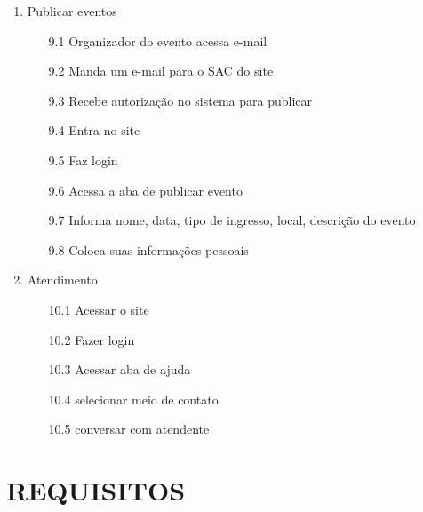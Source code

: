 \documentclass[12pt]{article}
\begin{document}
\begin{enumerate}
            \item Publicar eventos
                \begin{enumerate}
                    \item[9.1] Organizador do evento acessa e-mail
                    \item[9.2] Manda um e-mail para o SAC do site
                    \item[9.3] Recebe autorização no sistema para publicar
                    \item[9.4] Entra no site
                    \item[9.5] Faz login
                    \item[9.6] Acessa a aba de publicar evento
                    \item[9.7] Informa nome, data, tipo de ingresso, local, descrição do evento
                    \item[9.8] Coloca suas informações pessoais
                \end{enumerate}
            
            \item Atendimento
                \begin{enumerate}
                    \item[10.1] Acessar o site
                    \item[10.2] Fazer login
                    \item[10.3] Acessar aba de ajuda
                    \item[10.4] selecionar meio de contato
                    \item[10.5] conversar com atendente
                \end{enumerate}
        \end{enumerate}
        
    \section{REQUISITOS}
\end{document}
